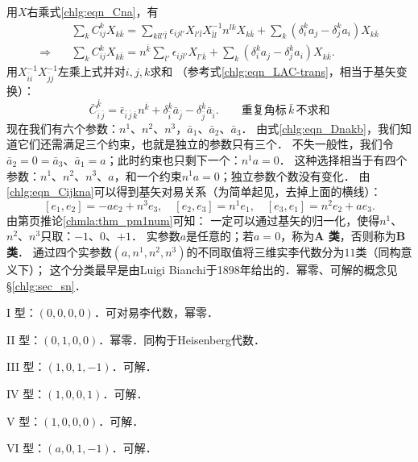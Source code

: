 用$X$右乘式\eqref{chlg:eqn_Cna}，有
\begin{align*}
	&\sum\nolimits_{k} C^k_{ij} X_{k \bar{k}}
	= \sum\nolimits_{kl l'\bar{l}} \epsilon_{ijl'} X_{l' \bar{l}} X^{-1}_{\bar{l}l} n^{lk} X_{k \bar{k}} 
	+\sum\nolimits_{k} (\delta^k_i a_j - \delta^k_j a_i ) X_{k \bar{k}} \\
	\Rightarrow\quad  & \sum\nolimits_{k} C^k_{ij} X_{k \bar{k}}
	= n^{\bar{k}}  \sum\nolimits_{ l'}  \epsilon_{ijl'}  X_{l' \bar{k}} 
	+\sum\nolimits_{k} (\delta^k_i a_j - \delta^k_j a_i ) X_{k \bar{k}} .
\end{align*}
用$X^{-1}_{\bar{i}i}X^{-1}_{\bar{j}j}$左乘上式并对$i,j,k$求和
（参考式\eqref{chlg:eqn_LAC-trans}，相当于基矢变换）：
\begin{equation}\label{chlg:eqn_Cijkna}
		\bar{C}^{\bar{k}}_{\bar{i}\,\bar{j}} = \bar{\epsilon}_{\bar{i}\,\bar{j}\,\bar{k}} n^{\bar{k}} 
		+\delta^{\bar{k}}_{\bar{i}} \bar{a}_{\bar{j}} - \delta^{\bar{k}}_{\bar{j}} \bar{a}_{\bar{i}}  .
		\qquad \text{重复角标}\,\bar{k}\,\text{不求和}
\end{equation}
现在我们有六个参数：$n^1$、$n^2$、$n^3$，$\bar{a}_1$、$\bar{a}_2$、$\bar{a}_3$．
由式\eqref{chlg:eqn_Dnakb}，我们知道它们还需满足三个约束，也就是独立的参数只有三个．
不失一般性，我们令$\bar{a}_2=0=\bar{a}_3$、$\bar{a}_1=a$；此时约束也只剩下一个：$n^1 a =0$．
这种选择相当于有四个参数：$n^1$、$n^2$、$n^3$、$a$，和一个约束$n^1 a =0$；独立参数个数没有变化．
由\eqref{chlg:eqn_Cijkna}可以得到基矢对易关系（为简单起见，去掉上面的横线）：
\begin{equation}\label{chlg:eqn_G3-bc}
	[e_1,e_2]=-a e_2 + n^3 e_3,\quad
	[e_2,e_3]= n^1 e_1,\quad
	[e_3,e_1]=n^2 e_2 + a e_3 .
\end{equation}
由第\pageref{chmla:thm_pm1num}页推论\ref{chmla:thm_pm1num}可知：
一定可以通过基矢的归一化，使得$n^1$、$n^2$、$n^3$只取：$-1$、$0$、$+1$．
实参数$a$是任意的；若$a=0$，称为{\bfseries\heiti A 类}，否则称为{\bfseries\heiti B 类}．
通过四个实参数$(a,n^1,n^2,n^3)$的不同取值将三维实李代数分为$11$类（同构意义下）；
这个分类最早是由Luigi Bianchi于1898年给出的．幂零、可解的概念见\S\ref{chlg:sec_sn}．

{I 型}：$(0,0,0,0)$．可对易李代数，幂零．

{II 型}：$(0,1,0,0)$．幂零．同构于Heisenberg代数．

{III 型}：$(1,0,1,-1)$．可解．

{IV 型}：$(1,0,0,1)$．可解．

{V 型}：$(1,0,0,0)$．可解．

{VI 型}：$(a,0,1,-1)$．可解．

